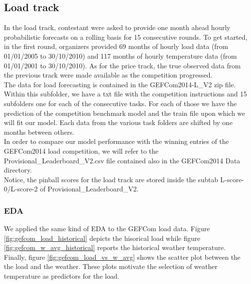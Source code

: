 \subsection{Load track}
In the load track, contestant were asked to provide one month ahead hourly probabilistic forecasts on a rolling basis for 15 consecutive rounds. To get started, in the first round, organizers provided 69 months of hourly load data (from 01/01/2005 to 30/10/2010) and 117 months of hourly temperature data (from 01/01/2001 to 30/10/2010). 
As for the price track, the true observed data from the previous track were made available as the competition progressed.
\\
The data for load forecasting is contained in the GEFCom2014-L\_V2 zip file. Within this subfolder, we have a txt file with the competition instructions and 15 subfolders one for each of the consecutive tasks. For each of those we have the prediction of the competition benchmark model and the train file upon which we will fit our model.
Each data from the various task folders are shifted by one months between others.
\\
In order to compare our model performance with the winning entries of the GEFCom2014 load competition, we will refer to the Provisional\_Leaderboard\_V2.csv file contained also in the GEFCom2014 Data directory.
\\
Notice, the pinball scores for the load track are stored inside the subtab L-score-0/L-score-2 of Provisional\_Leaderboard\_V2.
\subsubsection{EDA}
We applied the same kind of EDA to the GEFCom load data. Figure \ref{fig:gefcom_load_historical} depicts the hisorical load while figure \ref{fig:gefcom_w_avg_historical} reports the historical weather temperature. Finally, figure \ref{fig:gefcom_load_vs_w_avg} shows the scatter plot between the the load and the weather.
These plots motivate the selection of weather temperature as predictors for the load.

